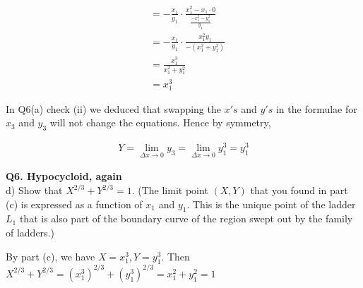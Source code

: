 \documentclass[9pt]{article}
\begin{document}
\begin{align*}
                                                                       &= -\frac{x_1}{y_1} \cdot \frac{x_1^2 - x_1 \cdot 0}{\frac{-x_1^2 - y_1^2}{y_1}} \\
                                                                       &= -\frac{x_1}{y_1} \cdot \frac{x_1^2 y_1}{-(x_1^2 + y_1^2)} \\
                                                                       &= \frac{x_1^3}{x_1^2 + y_1^2} \\
                                                                       &= x_1^3 \tag*{(Ladder $L_1$ has length $x_1^2 + y_1^2 = 1$)}
\end{align*}

In Q6(a) check (ii) we deduced that swapping the $x's$ and $y's$ in the formulae for $x_3$ and $y_3$ will not change the equations. Hence by symmetry,

\begin{align*}
  Y = \lim_{\Delta x \rightarrow 0} y_3 = \lim_{\Delta x \rightarrow 0} y_1^3 = y_1^3
\end{align*}

\begin{tcolorbox}
  \textbf{Q6. Hypocycloid, again} \\
  d) Show that $X^{2/3} + Y^{2/3} = 1$. (The limit point $(X,Y)$ that you found in part (c) is expressed as a function of $x_1$ and $y_1$. This is the unique point of the ladder $L_1$ that is also part of the boundary curve of the region swept out by the family of ladders.)
\end{tcolorbox}

By part (c), we have $X = x_1^3, Y = y_1^3$. Then $X^{2/3} + Y^{2/3} = (x_1^3)^{2/3} + (y_1^3)^{2/3} = x_1^2 + y_1^2 = 1$
\end{document}
